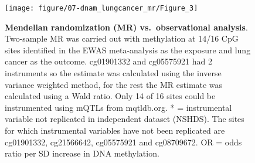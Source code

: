 \documentclass[11pt,twoside]{bristolthesis}
\begin{document}
\begin{figure}

{\centering \texttt{[image: figure/07-dnam\_lungcancer\_mr/Figure\_3]} 

}

\caption[Mendelian randomization (MR) vs.~observational analysis]{\textbf{Mendelian randomization (MR) vs.~observational analysis}. Two-sample MR was carried out with methylation at 14/16 CpG sites identified in the EWAS meta-analysis as the exposure and lung cancer as the outcome. cg01901332 and cg05575921 had 2 instruments so the estimate was calculated using the inverse variance weighted method, for the rest the MR estimate was calculated using a Wald ratio. Only 14 of 16 sites could be instrumented using mQTLs from mqtldb.org. * = instrumental variable not replicated in independent dataset (NSHDS). The sites for which instrumental variables have not been replicated are cg01901332, cg21566642, cg05575921 and cg08709672. OR = odds ratio per SD increase in DNA methylation.}\label{fig:fig3-07}
\end{figure}
\end{document}
